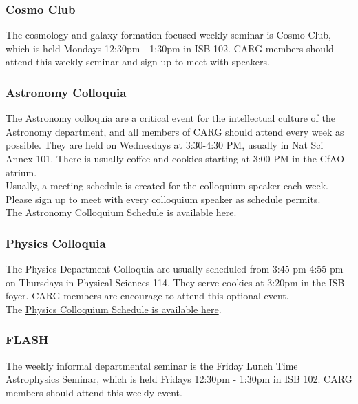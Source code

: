 \documentclass[fleqn,10pt]{wlscirep}
\begin{document}
\subsubsection{Cosmo Club}
\label{sec:cosmo_club}

The cosmology and galaxy
formation-focused weekly
seminar is Cosmo Club, 
which is held
Mondays 12:30pm - 1:30pm in
ISB 102. CARG members should
attend this weekly seminar
and sign up 
to meet with speakers.

\subsubsection{Astronomy Colloquia}
\label{sec:astro_colloquia}

The Astronomy colloquia are a
critical event for the
intellectual culture of the
Astronomy department, and all
members of CARG should attend
every week as possible.
They are held on Wednesdays
at 3:30-4:30 PM, usually in
Nat Sci Annex 101.
There is usually
coffee and cookies starting
at 3:00 PM in the CfAO atrium.\\

\noindent
Usually, a meeting schedule is 
created for the colloquium speaker each
week. Please sign up to meet
with every colloquium speaker as
schedule permits.\\

\noindent
The
\href{https://www.astro.ucsc.edu/news-events/Seminars/index.html}{Astronomy Colloquium Schedule is available here}.

\subsubsection{Physics Colloquia}
\label{sec:phys_colloquia}

The Physics Department Colloquia are usually
scheduled from 3:45 pm-4:55 pm on Thursdays
in Physical Sciences 114. They serve
cookies at 3:20pm in the ISB foyer. 
CARG members are encourage to attend
this optional event.\\

\noindent
The
\href{https://www.physics.ucsc.edu/news-events/colloquia/index.html}{Physics Colloquium Schedule is available here}.

\subsubsection{FLASH}
\label{sec:flash}

The weekly informal departmental
seminar is the
Friday Lunch Time Astrophysics Seminar,
which is held
Fridays 12:30pm - 1:30pm in ISB 102.
CARG members should attend this
weekly event.\\
\end{document}
